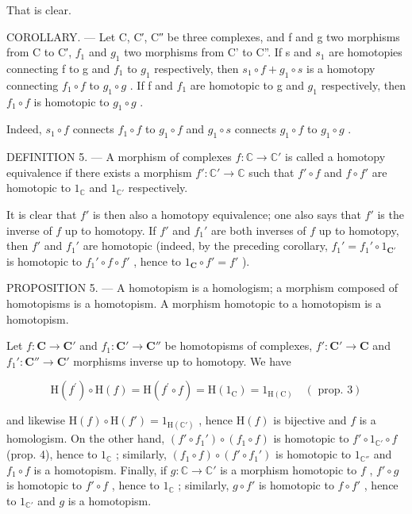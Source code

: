 That is clear.

COROLLARY. --- Let C, C′, C″ be three complexes, and f and g two morphisms from C to C′, \(f_{1}\) and \(g_{1}\) two morphisms from C' to C''. If s and \(s_{1}\) are homotopies connecting f to g and \(f_{1}\) to \(g_{1}\) respectively, then \(s_{1} \circ f + g_{1} \circ s\) is a homotopy connecting \(f_{1} \circ f\) to \(g_{1} \circ g\) . If f and \(f_{1}\) are homotopic to g and \(g_{1}\) respectively, then \(f_{1} \circ f\) is homotopic to \(g_{1} \circ g\) .

Indeed, \(s_{1} \circ f\) connects \(f_{1} \circ f\) to \(g_{1} \circ f\) and \(g_{1} \circ s\) connects \(g_{1} \circ f\) to \(g_{1} \circ g\) .

DEFINITION 5. --- A morphism of complexes \(f: \mathbb{C} \to \mathbb{C}'\) is called a homotopy equivalence if there exists a morphism \(f': \mathbb{C}' \to \mathbb{C}\) such that \(f' \circ f\) and \(f \circ f'\) are homotopic to \(1_{\mathbb{C}}\) and \(1_{\mathbb{C}'}\) respectively.

It is clear that \(f'\) is then also a homotopy equivalence; one also says that \(f'\) is the inverse of \(f\) up to homotopy. If \(f'\) and \(f_1'\) are both inverses of \(f\) up to homotopy, then \(f'\) and \(f_1'\) are homotopic (indeed, by the preceding corollary, \(f_1' = f_1' \circ 1_{\mathbf{C}'}\) is homotopic to \(f_1' \circ f \circ f'\) , hence to \(1_{\mathbf{C}} \circ f' = f'\) ).

PROPOSITION 5. — A homotopism is a homologism; a morphism composed of homotopisms is a homotopism. A morphism homotopic to a homotopism is a homotopism.

Let \(f: \mathbf{C} \to \mathbf{C}'\) and \(f_1: \mathbf{C}' \to \mathbf{C}''\) be homotopisms of complexes, \(f': \mathbf{C}' \to \mathbf{C}\) and \(f_1': \mathbf{C}'' \to \mathbf{C}'\) morphisms inverse up to homotopy. We have

\[
\mathrm{H} (f ^ {\prime}) \circ \mathrm{H} (f) = \mathrm{H} (f ^ {\prime} \circ f) = \mathrm{H} (1 _ {\mathrm{C}}) = 1 _ {\mathrm{H(C)}} \quad (\text { prop. } 3)
\]

and likewise \(\mathrm{H}(f) \circ \mathrm{H}(f') = 1_{\mathrm{H}(\mathbb{C}')}\) , hence \(\mathrm{H}(f)\) is bijective and \(f\) is a homologism. On the other hand, \((f' \circ f_1') \circ (f_1 \circ f)\) is homotopic to \(f' \circ 1_{\mathbb{C}'} \circ f\) (prop. 4), hence to \(1_{\mathbb{C}}\) ; similarly, \((f_1 \circ f) \circ (f' \circ f_1')\) is homotopic to \(1_{\mathbb{C}''}\) and \(f_1 \circ f\) is a homotopism. Finally, if \(g: \mathbb{C} \to \mathbb{C}'\) is a morphism homotopic to \(f\) , \(f' \circ g\) is homotopic to \(f' \circ f\) , hence to \(1_{\mathbb{C}}\) ; similarly, \(g \circ f'\) is homotopic to \(f \circ f'\) , hence to \(1_{\mathbb{C}'}\) and \(g\) is a homotopism.

